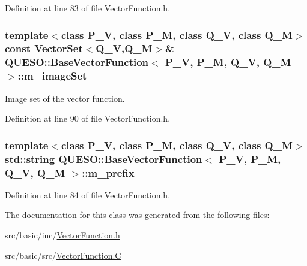 Definition at line 83 of file Vector\-Function.\-h.

\hypertarget{class_q_u_e_s_o_1_1_base_vector_function_a442585224e86695e302757c0fad17913}{
\subsubsection[{m\-\_\-image\-Set}]{\setlength{\rightskip}{0pt plus 5cm}template$<$class P\-\_\-\-V, class P\-\_\-\-M, class Q\-\_\-\-V, class Q\-\_\-\-M$>$ const {\bf Vector\-Set}$<$Q\-\_\-\-V,Q\-\_\-\-M$>$\& {\bf Q\-U\-E\-S\-O\-::\-Base\-Vector\-Function}$<$ P\-\_\-\-V, P\-\_\-\-M, Q\-\_\-\-V, Q\-\_\-\-M $>$\-::m\-\_\-image\-Set\hspace{0.3cm}{\ttfamily [protected]}}}\label{class_q_u_e_s_o_1_1_base_vector_function_a442585224e86695e302757c0fad17913}


Image set of the vector function. 



Definition at line 90 of file Vector\-Function.\-h.

\hypertarget{class_q_u_e_s_o_1_1_base_vector_function_aacf92c70a9f6d0a951943aa708b7cfa6}{
\subsubsection[{m\-\_\-prefix}]{\setlength{\rightskip}{0pt plus 5cm}template$<$class P\-\_\-\-V, class P\-\_\-\-M, class Q\-\_\-\-V, class Q\-\_\-\-M$>$ std\-::string {\bf Q\-U\-E\-S\-O\-::\-Base\-Vector\-Function}$<$ P\-\_\-\-V, P\-\_\-\-M, Q\-\_\-\-V, Q\-\_\-\-M $>$\-::m\-\_\-prefix\hspace{0.3cm}{\ttfamily [protected]}}}\label{class_q_u_e_s_o_1_1_base_vector_function_aacf92c70a9f6d0a951943aa708b7cfa6}


Definition at line 84 of file Vector\-Function.\-h.



The documentation for this class was generated from the following files\-:\begin{DoxyCompactItemize}
\item 
src/basic/inc/\hyperlink{_vector_function_8h}{Vector\-Function.\-h}\item 
src/basic/src/\hyperlink{_vector_function_8_c}{Vector\-Function.\-C}\end{DoxyCompactItemize}
